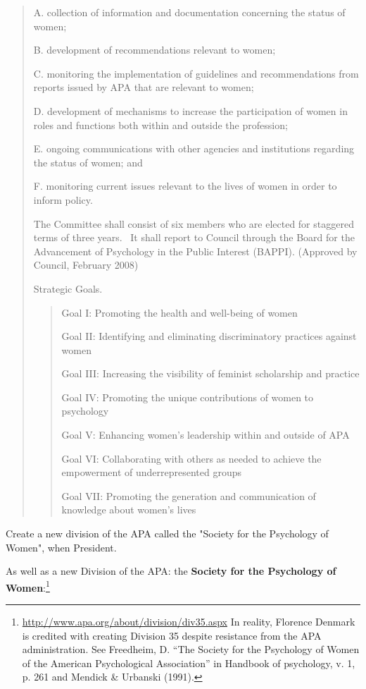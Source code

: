 \begin{refsection}
\begin{quote}

A. collection of information and documentation concerning the status of women;

B. development of recommendations relevant to women;

C. monitoring the implementation of guidelines and recommendations from reports issued by APA that are relevant to women;

D. development of mechanisms to increase the participation of women in roles and functions both within and outside the profession;

E. ongoing communications with other agencies and institutions regarding the status of women; and

F. monitoring current issues relevant to the lives of women in order to inform policy.

The Committee shall consist of six members who are elected for staggered terms of three years.  It shall report to Council through the Board for the Advancement of Psychology in the Public Interest (BAPPI). (Approved by Council, February 2008)

Strategic Goals. 

\begin{quote}

Goal I: Promoting the health and well-being of women

Goal II: Identifying and eliminating discriminatory practices against women

Goal III: Increasing the visibility of feminist scholarship and practice

Goal IV: Promoting the unique contributions of women to psychology

Goal V: Enhancing women’s leadership within and outside of APA

Goal VI: Collaborating with others as needed to achieve the empowerment of underrepresented groups

Goal VII: Promoting the generation and communication of knowledge about women’s lives
\end{quote}
\end{quote}

\begin{proposal}[Anastasi]\label{proposal:anastasiB}
Create a  new division of the APA called the "Society for the Psychology of Women", when President.
\end{proposal}

As well as a new Division of the APA: the \textbf{Society for the Psychology of Women}:\footnote{\url{http://www.apa.org/about/division/div35.aspx} In reality, Florence Denmark is credited with creating Division 35 despite resistance from the APA administration. See Freedheim, D. “The Society for the Psychology of Women of the American Psychological Association” in Handbook of psychology, v. 1, p. 261 and Mendick \& Urbanski (1991).}


\end{refsection}
